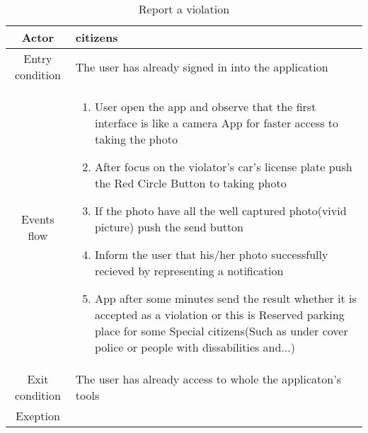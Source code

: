 \documentclass{article}
\begin{document}
			\begin{table} [H]
		\begin{center}
		\caption{Report a violation}
		\begin{tabular}{|c|p{8cm}|}
			\hline
			Actor&citizens\\
			\hline
			Entry condition&The user has already signed in into the application\\
			\hline
			 Events flow&
			\begin{enumerate}
			\item User open the app and observe that the first interface is like a camera App for faster access to taking the 					photo			
			\item After focus on the violator's car's license plate push the Red Circle Button to taking photo
			\item If the photo have all the well captured photo(vivid picture) push the send button
			\item Inform the user that his/her photo successfully recieved by representing a notification
			\item App after some minutes send the result whether it is accepted as a violation or this is Reserved parking place  				for some Special citizens(Such as under cover police or people with dissabilities and...)
			\end{enumerate}\\
			\hline
			Exit condition& The user has already access to whole the applicaton's tools\\
			\hline
			Exeption&\\
			\hline
		\end{tabular}
				
		\end{center}


		\end{table} 
\end{document}
